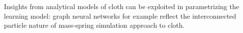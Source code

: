 \documentclass[\home/main.tex]{subfiles}
\begin{document}
    
Insights from analytical models of cloth can be exploited in parametrizing the learning model: graph neural networks for example reflect the interconnected particle nature of mass-spring simulation approach to cloth. 
\end{document}

